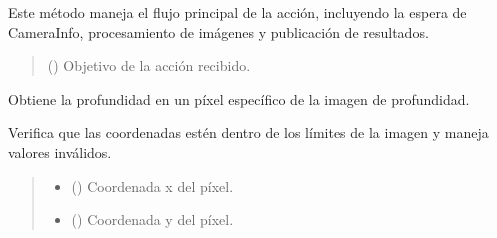 \documentclass[a4paper,10pt,spanish]{sphinxmanual}
\begin{document}
\begin{fulllineitems}
\begin{fulllineitems}
\sphinxAtStartPar
Este método maneja el flujo principal de la acción, incluyendo la espera de CameraInfo,
procesamiento de imágenes y publicación de resultados.
\begin{quote}\begin{description}
\sphinxAtStartPar
{} () \textendash{} Objetivo de la acción recibido.

\end{description}\end{quote}

\end{fulllineitems}


\begin{fulllineitems}
\label{\detokenize{squad_object_detection_action:squad_object_detection_action.TurtleBotObjectDetectionAction.get_depth_at_pixel}}
\pysigstartsignatures
{}
\pysigstopsignatures
\sphinxAtStartPar
Obtiene la profundidad en un píxel específico de la imagen de profundidad.

\sphinxAtStartPar
Verifica que las coordenadas estén dentro de los límites de la imagen y maneja valores inválidos.
\begin{quote}\begin{description}
\begin{itemize}
\item {} 
\sphinxAtStartPar
{} () \textendash{} Coordenada x del píxel.

\item {} 
\sphinxAtStartPar
{} () \textendash{} Coordenada y del píxel.

\end{itemize}


\end{description}
\end{quote}
\end{fulllineitems}
\end{fulllineitems}
\end{document}
